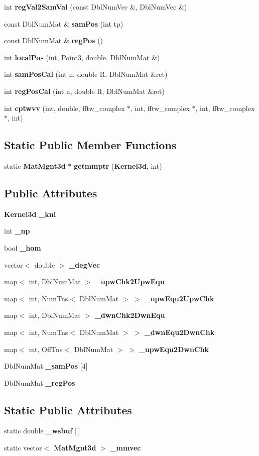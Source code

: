 \begin{CompactItemize}
int {\bf reg\-Val2Sam\-Val} (const Dbl\-Num\-Vec \&, Dbl\-Num\-Vec \&)
\item 
const Dbl\-Num\-Mat \& {\bf sam\-Pos} (int tp)
\item 
const Dbl\-Num\-Mat \& {\bf reg\-Pos} ()
\item 
int {\bf local\-Pos} (int, Point3, double, Dbl\-Num\-Mat \&)
\item 
int {\bf sam\-Pos\-Cal} (int n, double R, Dbl\-Num\-Mat \&ret)
\item 
int {\bf reg\-Pos\-Cal} (int n, double R, Dbl\-Num\-Mat \&ret)
\item 
int {\bf cptwvv} (int, double, fftw\_\-complex $\ast$, int, fftw\_\-complex $\ast$, int, fftw\_\-complex $\ast$, int)
\end{CompactItemize}
\subsection*{Static Public Member Functions}
\begin{CompactItemize}
\item 
static {\bf Mat\-Mgnt3d} $\ast$ {\bf getmmptr} ({\bf Kernel3d}, int)
\end{CompactItemize}
\subsection*{Public Attributes}
\begin{CompactItemize}
\item 
{\bf Kernel3d} {\bf \_\-knl}
\item 
int {\bf \_\-np}
\item 
bool {\bf \_\-hom}
\item 
vector$<$ double $>$ {\bf \_\-deg\-Vec}
\item 
map$<$ int, Dbl\-Num\-Mat $>$ {\bf \_\-upw\-Chk2Upw\-Equ}
\item 
map$<$ int, Num\-Tns$<$ Dbl\-Num\-Mat $>$ $>$ {\bf \_\-upw\-Equ2Upw\-Chk}
\item 
map$<$ int, Dbl\-Num\-Mat $>$ {\bf \_\-dwn\-Chk2Dwn\-Equ}
\item 
map$<$ int, Num\-Tns$<$ Dbl\-Num\-Mat $>$ $>$ {\bf \_\-dwn\-Equ2Dwn\-Chk}
\item 
map$<$ int, Off\-Tns$<$ Dbl\-Num\-Mat $>$ $>$ {\bf \_\-upw\-Equ2Dwn\-Chk}
\item 
Dbl\-Num\-Mat {\bf \_\-sam\-Pos} [4]
\item 
Dbl\-Num\-Mat {\bf \_\-reg\-Pos}
\end{CompactItemize}
\subsection*{Static Public Attributes}
\begin{CompactItemize}
\item 
static double {\bf \_\-wsbuf} [$\,$]
\item 
static vector$<$ {\bf Mat\-Mgnt3d} $>$ {\bf \_\-mmvec}
\end{CompactItemize}


